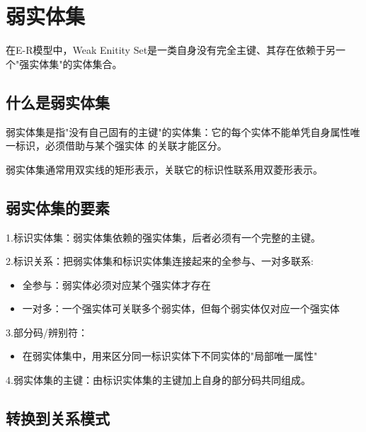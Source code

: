 \section{弱实体集}

在E-R模型中，Weak Enitity Set是一类自身没有完全主键、其存在依赖于另一个"强实体集"的实体集合。

\subsection{什么是弱实体集}

弱实体集是指"没有自己固有的主键"的实体集：它的每个实体不能单凭自身属性唯一标识，必须借助与某个强实体
的关联才能区分。

弱实体集通常用双实线的矩形表示，关联它的标识性联系用双菱形表示。

\subsection{弱实体集的要素}

1.标识实体集：弱实体集依赖的强实体集，后者必须有一个完整的主键。

2.标识关系：把弱实体集和标识实体集连接起来的全参与、一对多联系:
\begin{itemize}
    \item 全参与：弱实体必须对应某个强实体才存在
    \item 一对多：一个强实体可关联多个弱实体，但每个弱实体仅对应一个强实体
\end{itemize}

3.部分码/辨别符：
\begin{itemize}
    \item 在弱实体集中，用来区分同一标识实体下不同实体的"局部唯一属性"
\end{itemize}

4.弱实体集的主键：由标识实体集的主键加上自身的部分码共同组成。

\subsection{转换到关系模式}

